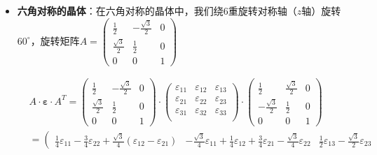 \begin{itemize}[itemsep=0pt,parsep=0pt]
        \item \textbf{六角对称的晶体}：在六角对称的晶体中，我们绕6重旋转对称轴（$z$轴）旋转$60^{\circ}$，旋转矩阵$ 
        A=
        \left(
        \begin{array}{ccc}
            \frac{1}{2} & -\frac{\sqrt{3}}{2} & 0 \\
            \frac{\sqrt{3}}{2} & \frac{1}{2} & 0 \\
            0 & 0 & 1
        \end{array}
        \right)
        $
        
        \begin{align*}
                &A \cdot \boldsymbol{\varepsilon} \cdot A^{T}=
                \left(
                \begin{array}{ccc}
                    \frac{1}{2} & -\frac{\sqrt{3}}{2} & 0 \\
                    \frac{\sqrt{3}}{2} & \frac{1}{2} & 0 \\
                    0 & 0 & 1
                \end{array}
                \right)
                \cdot
                \left(
                \begin{array}{ccc}
                    \varepsilon_{11} & \varepsilon_{12} & \varepsilon_{13} \\
                    \varepsilon_{21} & \varepsilon_{22} & \varepsilon_{23} \\
                    \varepsilon_{31} & \varepsilon_{32} & \varepsilon_{33} \\
                \end{array}
                \right)
                \cdot
                \left(
                \begin{array}{ccc}
                    \frac{1}{2} & \frac{\sqrt{3}}{2} & 0 \\
                    -\frac{\sqrt{3}}{2} & \frac{1}{2} & 0 \\
                    0 & 0 & 1
                \end{array}
                \right)\\
                &=
                \left(
                \begin{array}{ccc}
                \frac{1}{4}\varepsilon_{11}-\frac{3}{4}\varepsilon_{22}+\tfrac{\sqrt{3}}{4}(\varepsilon_{12}-\varepsilon_{21}) &
                -\tfrac{\sqrt{3}}{4}\varepsilon_{11}+\tfrac{1}{4}\varepsilon_{12}+\tfrac{3}{4}\varepsilon_{21}-\tfrac{\sqrt{3}}{4}\varepsilon_{22} &
                \tfrac{1}{2}\varepsilon_{13}-\tfrac{\sqrt{3}}{2}\varepsilon_{23}

\end{array}
\end{align*}
\end{itemize}
